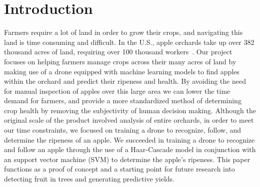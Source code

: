 \section{Introduction}
Farmers require a lot of land in order to grow their crops, and navigating this land is time consuming and difficult.
In the U.S., apple orchards take up over 382 thousand acres of land, requiring over 100 thousand workers~\cite{USApple}. 
Our project focuses on helping farmers manage crops across their many acres of land by making use of a drone equipped with machine learning models to 
find apples within the orchard and predict their ripeness and health. By avoiding the need for manual inspection of apples over this large area 
we can lower the time demand for farmers, and provide a more standardized method of determining crop health by removing the subjectivity of human decision making.
Although the original scale of the product involved analysis of entire orchards, in order to meet our time constraints, we focused on training a drone to recognize, follow, and determine the ripeness of an apple. 
We succeeded in training a drone to recognize and follow an apple through the use of a Haar-Cascade model in conjunction with an support vector machine (SVM) to determine the apple's ripeness.
This paper functions as a proof of concept and a starting point for future research into detecting fruit in trees and generating predictive yields.
\\
